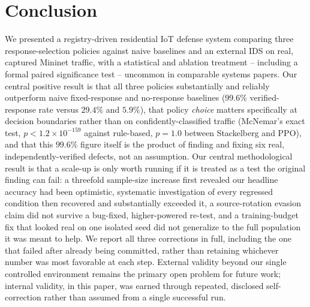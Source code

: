 \documentclass[conference]{IEEEtran}
\begin{document}
\section{Conclusion}

We presented a registry-driven residential IoT defense system comparing three response-selection
policies against naive baselines and an external IDS on real, captured Mininet traffic, with a
statistical and ablation treatment -- including a formal paired significance test -- uncommon in
comparable systems papers. Our central positive result is that all three policies substantially and
reliably outperform naive fixed-response and no-response baselines ($99.6\%$ verified-response rate
versus $29.4\%$ and $5.9\%$), that policy \emph{choice} matters specifically at decision boundaries
rather than on confidently-classified traffic (McNemar's exact test, $p<1.2\times10^{-159}$ against
rule-based, $p=1.0$ between Stackelberg and PPO), and that this $99.6\%$ figure itself is the
product of finding and fixing six real, independently-verified defects, not an assumption. Our
central methodological result is that a scale-up is only worth running if it is treated as a test
the original finding can fail: a threefold sample-size increase first revealed our headline accuracy
had been optimistic, systematic investigation of every regressed condition then recovered and
substantially exceeded it, a source-rotation evasion claim did not survive a bug-fixed,
higher-powered re-test, and a training-budget fix that looked real on one isolated seed did not
generalize to the full population it was meant to help. We report all three corrections in full,
including the one that failed after already being committed, rather than retaining whichever
number was most favorable at each step. External validity beyond our single controlled environment
remains the primary open problem for future work; internal validity, in this paper, was earned
through repeated, disclosed self-correction rather than assumed from a single successful run.



\end{document}
